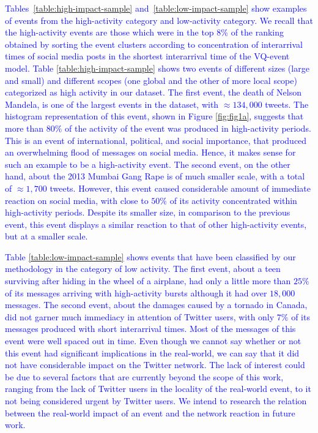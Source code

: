 \documentclass[10pt,letterpaper]{article}
\begin{document}
\textcolor{blue}{Tables~\ref{table:high-impact-sample}
and~\ref{table:low-impact-sample} show examples of events from the
high-activity category and low-activity category. We recall that the
high-activity events are those which were in the top 8\% of the
ranking obtained by sorting the event clusters according to
concentration of interarrival times of social media posts in the
shortest interarrival time of the VQ-event model.  Table
\ref{table:high-impact-sample} shows two events of different sizes
(large and small) and different scopes (one global and the other of
more local scope) categorized as high activity in our dataset. The
first event, the death of Nelson Mandela, is one of the largest events
in the dataset, with $\approx 134,000$ tweets. The histogram
representation of this event, shown in Figure \ref{fig:fig1a}, suggests
that more than $80\%$ of the activity of the event was produced in
high-activity periods.  This is an event of international, political,
and social importance, that produced an overwhelming flood of messages
on social media. %
Hence, it makes
sense for such an example to be a high-activity event.  The second
event, on the other hand, about the 2013 Mumbai Gang Rape is of much
smaller scale, with a total of $\approx 1,700$ tweets.  However, this
event caused considerable amount of immediate reaction on social
media, with close to $50\%$ of its activity concentrated within
high-activity periods. Despite its smaller size, in comparison to the
previous event, this event displays a similar reaction to that of
other high-activity events, but at a smaller scale. }

\textcolor{blue}{Table \ref{table:low-impact-sample} shows events that have been
classified by our methodology in the category of low activity.  The
first event, about a teen surviving after hiding in the wheel of a
airplane, had only a little more than $25\%$ of its messages arriving
with high-activity bursts although it had over $18,000$ messages.  The
second event, about the damages caused by a tornado in Canada, did not
garner much immediacy in attention of Twitter users, with only $7\%$
of its messages produced with short interarrival times. Most of the
messages of this event were well spaced out in time. Even though we
cannot say whether or not this event had significant implications in
the real-world, we can say that it did not have considerable impact on
the Twitter network. The lack of interest could be due to several
factors that are currently beyond the scope of this work, ranging from
the lack of Twitter users in the locality of the real-world event, to
it not being considered urgent by Twitter users. We intend to research
the relation between the real-world impact of an event and the network
reaction in future work.}
\end{document}
